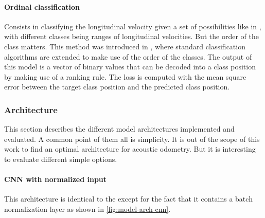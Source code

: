 \paragraph{Ordinal classification} \label{para:model-task-ord-class} Consists
in classifying the longitudinal velocity given a set of possibilities like in
, with different classes being ranges of
longitudinal velocities. But the order of the class matters. This method was
introduced in \cite{ordclass2006}, where standard classification algorithms are
extended to make use of the order of the classes. The output of this model is a
vector of binary values that can be decoded into a class position by making use
of a ranking rule. The loss is computed with the mean square error between the
target class position and the predicted class position. 

\subsubsection{Architecture} \label{subsec:model-architecture}

This section describes the different model architectures implemented and
evaluated. A common point of them all is simplicity. It is out of the scope of
this work to find an optimal architecture for acoustic odometry. But it is
interesting to evaluate different simple options.

\paragraph{CNN with normalized input} \label{para:model-arch-norm-cnn} This
architecture is identical to the  except for the
fact that it contains a batch normalization layer \cite{batchnorm2015} as shown
in \cref{fig:model-arch-cnn}.

